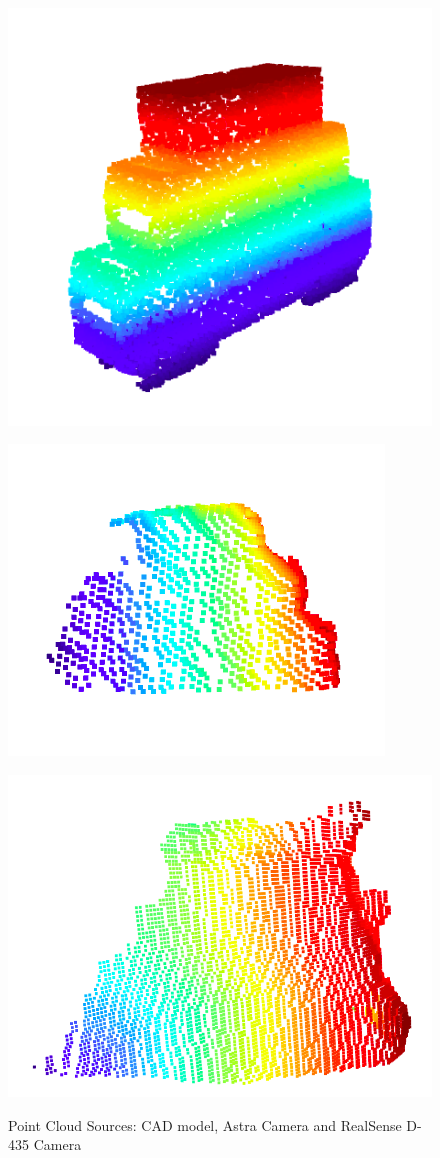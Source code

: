 \begin{figure}[htp]
\begin{center}
{
  \includegraphics[clip,width=0.6\columnwidth]{images/cad_cloud.png}
}
\end{center}
\begin{center}
{
  \includegraphics[clip,width=0.6\columnwidth]{images/astra_cloud.png}
}
\end{center}
\begin{center}
{
  \includegraphics[clip,width=0.6\columnwidth]{images/real_cloud.png}
}
\end{center}
\caption{Point Cloud Sources: CAD model, Astra Camera and RealSense D-435 Camera}
\label{cadastracloudresult}
\end{figure}

